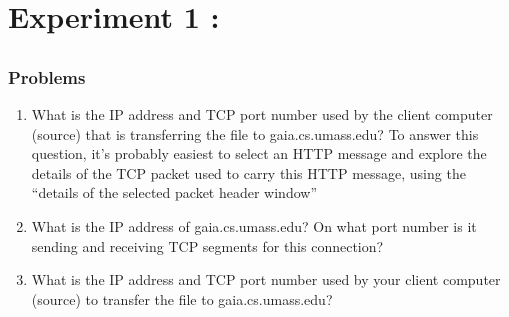 \section{Experiment 1 : }
\subsection{ }
    \subsubsection*{Problems}
    \begin{enumerate}[label=\bfseries Problem \arabic*:,leftmargin=*,labelindent=1em]
        \item What is the IP address and TCP port number used by the client computer (source) that is transferring the file to gaia.cs.umass.edu? 
        To answer this question, it’s probably easiest to select an HTTP message and explore the details of the TCP packet used to carry this HTTP message,
        using the “details of the selected packet header window”\\[0.2mm]
        \soln
        \item What is the IP address of gaia.cs.umass.edu? On what port number is it sending and receiving TCP segments for this connection?\\[0.2mm]
        \soln
        \item What is the IP address and TCP port number used by your client computer (source) to transfer the file to gaia.cs.umass.edu?\\[0.2mm]
        \soln
    \end{enumerate}
\newpage